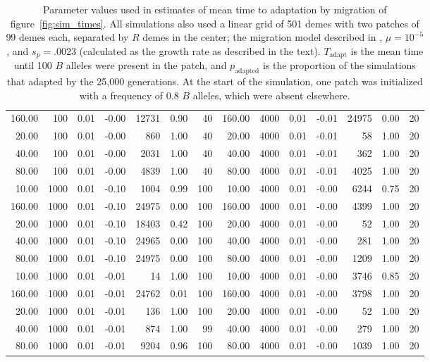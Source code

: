 \begin{table}[ht]
{\begin{tabular}{|rrrrrrr||rrrrrrr|}
  160.00 & 100 & 0.01 & -0.00 & 12731 & 0.90 & 40 & 160.00 & 4000 & 0.01 & -0.01 & 24975 & 0.00 & 20 \\ 
  20.00 & 100 & 0.01 & -0.00 & 860 & 1.00 & 40 & 20.00 & 4000 & 0.01 & -0.01 & 58 & 1.00 & 20 \\ 
  40.00 & 100 & 0.01 & -0.00 & 2031 & 1.00 & 40 & 40.00 & 4000 & 0.01 & -0.01 & 362 & 1.00 & 20 \\ 
  80.00 & 100 & 0.01 & -0.00 & 4839 & 1.00 & 40 & 80.00 & 4000 & 0.01 & -0.01 & 4025 & 1.00 & 20 \\ 
  10.00 & 1000 & 0.01 & -0.10 & 1004 & 0.99 & 100 & 10.00 & 4000 & 0.01 & -0.00 & 6244 & 0.75 & 20 \\ 
  160.00 & 1000 & 0.01 & -0.10 & 24975 & 0.00 & 100 & 160.00 & 4000 & 0.01 & -0.00 & 4399 & 1.00 & 20 \\ 
  20.00 & 1000 & 0.01 & -0.10 & 18403 & 0.42 & 100 & 20.00 & 4000 & 0.01 & -0.00 & 52 & 1.00 & 20 \\ 
  40.00 & 1000 & 0.01 & -0.10 & 24965 & 0.00 & 100 & 40.00 & 4000 & 0.01 & -0.00 & 281 & 1.00 & 20 \\ 
  80.00 & 1000 & 0.01 & -0.10 & 24975 & 0.00 & 100 & 80.00 & 4000 & 0.01 & -0.00 & 1209 & 1.00 & 20 \\ 
  10.00 & 1000 & 0.01 & -0.01 & 14 & 1.00 & 100 & 10.00 & 4000 & 0.01 & -0.00 & 3746 & 0.85 & 20 \\ 
  160.00 & 1000 & 0.01 & -0.01 & 24762 & 0.01 & 100 & 160.00 & 4000 & 0.01 & -0.00 & 3798 & 1.00 & 20 \\ 
  20.00 & 1000 & 0.01 & -0.01 & 136 & 1.00 & 100 & 20.00 & 4000 & 0.01 & -0.00 & 52 & 1.00 & 20 \\ 
  40.00 & 1000 & 0.01 & -0.01 & 874 & 1.00 & 99 & 40.00 & 4000 & 0.01 & -0.00 & 279 & 1.00 & 20 \\ 
  80.00 & 1000 & 0.01 & -0.01 & 9204 & 0.96 & 100 & 80.00 & 4000 & 0.01 & -0.00 & 1039 & 1.00 & 20 \\ 
   \hline
\end{tabular}
}
\caption{
            Parameter values used in estimates of mean time to adaptation by migration of figure~\ref{fig:sim_times}.
            All simulations also used a linear grid of 501 demes with two patches of 99 demes each,
            separated by $R$ demes in the center;
            the migration model described in ,
            $\mu=10^{-5}$, and $s_p=.0023$ (calculated as the growth rate as described in the text).
            $T_\text{adapt}$ is the mean time until 100 $B$ alleles were present in the patch,
            and $p_\text{adapted}$ is the proportion of the simulations that adapted by the 25,000 generations.
            At the start of the simulation, one patch was initialized with a frequency of 0.8 $B$ alleles, which were absent elsewhere.
            } 
\label{stab:migration_params}
\end{table}
